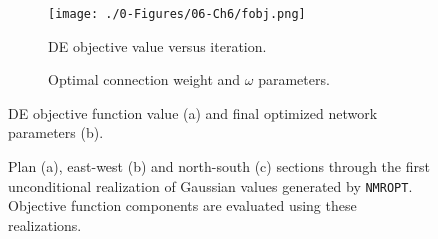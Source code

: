 

\begin{figure}
    \begin{subfigure}[c]{0.5\textwidth}
        \centering
        \texttt{[image: ./0-Figures/06-Ch6/fobj.png]}
        \caption{\Gls{DE} objective value versus iteration.}
        \label{fig:fobj}
    \end{subfigure}
    \begin{subfigure}[c]{0.5\textwidth}
        \centering
        \resizebox{0.9\width}{!}{}
        \caption{Optimal connection weight and $\omega$ parameters.}
        \label{tab:opt_omega}
    \end{subfigure}
    \caption{\Gls{DE} objective function value (a) and final optimized network parameters (b).}
    \label{}
\end{figure}


\begin{figure}
    \centering
    \tabskip=0pt
    \caption{Plan (a), east-west (b) and north-south (c) sections through the first unconditional realization of Gaussian values generated by \texttt{NMROPT}. Objective function components are evaluated using these realizations. }
    \label{fig:nmropt_uncond_reals}
\end{figure}

